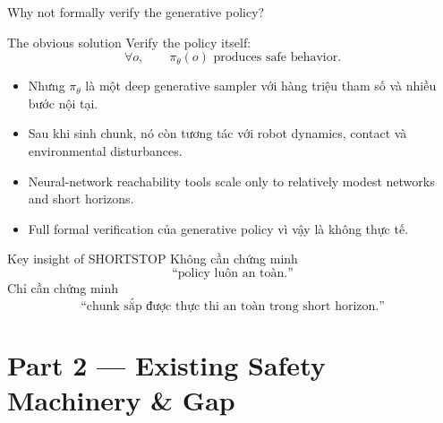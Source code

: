 \documentclass[aspectratio=169]{beamer}
\newcommand{\bad}[1]{\textcolor{red!60!black}{#1}}
\begin{document}
\begin{frame}[t,shrink=8]{Why not formally verify the generative policy?}

\begin{block}{The obvious solution}
Verify the policy itself:
\[
\forall o,\qquad
\pi_\theta(o)
\text{ produces safe behavior}.
\]
\end{block}

\begin{itemize}
    \item Nhưng $\pi_\theta$ là một deep generative sampler với hàng triệu
    tham số và nhiều bước nội tại.
    
    \item Sau khi sinh chunk, nó còn tương tác với robot dynamics,
    contact và environmental disturbances.
    
    \item Neural-network reachability tools scale only to relatively
    modest networks and short horizons.
    
    \item Full formal verification của generative policy vì vậy là
    \bad{không thực tế}.
\end{itemize}

\vspace{5pt}

\begin{alertblock}{Key insight of SHORTSTOP}
Không cần chứng minh
\[
\text{``policy luôn an toàn.''}
\]
Chỉ cần chứng minh
\[
\boxed{
\text{``chunk sắp được thực thi an toàn trong short horizon.''}
}
\]
\end{alertblock}
\end{frame}

\section{Part 2 --- Existing Safety Machinery \& Gap}
\end{document}
